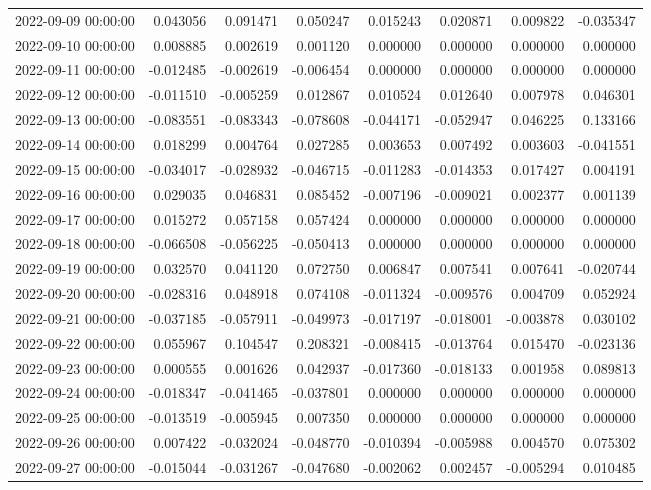 \begin{tabular}{lrrrrrrr}
2022-09-09 00:00:00 & 0.043056 & 0.091471 & 0.050247 & 0.015243 & 0.020871 & 0.009822 & -0.035347 \\
2022-09-10 00:00:00 & 0.008885 & 0.002619 & 0.001120 & 0.000000 & 0.000000 & 0.000000 & 0.000000 \\
2022-09-11 00:00:00 & -0.012485 & -0.002619 & -0.006454 & 0.000000 & 0.000000 & 0.000000 & 0.000000 \\
2022-09-12 00:00:00 & -0.011510 & -0.005259 & 0.012867 & 0.010524 & 0.012640 & 0.007978 & 0.046301 \\
2022-09-13 00:00:00 & -0.083551 & -0.083343 & -0.078608 & -0.044171 & -0.052947 & 0.046225 & 0.133166 \\
2022-09-14 00:00:00 & 0.018299 & 0.004764 & 0.027285 & 0.003653 & 0.007492 & 0.003603 & -0.041551 \\
2022-09-15 00:00:00 & -0.034017 & -0.028932 & -0.046715 & -0.011283 & -0.014353 & 0.017427 & 0.004191 \\
2022-09-16 00:00:00 & 0.029035 & 0.046831 & 0.085452 & -0.007196 & -0.009021 & 0.002377 & 0.001139 \\
2022-09-17 00:00:00 & 0.015272 & 0.057158 & 0.057424 & 0.000000 & 0.000000 & 0.000000 & 0.000000 \\
2022-09-18 00:00:00 & -0.066508 & -0.056225 & -0.050413 & 0.000000 & 0.000000 & 0.000000 & 0.000000 \\
2022-09-19 00:00:00 & 0.032570 & 0.041120 & 0.072750 & 0.006847 & 0.007541 & 0.007641 & -0.020744 \\
2022-09-20 00:00:00 & -0.028316 & 0.048918 & 0.074108 & -0.011324 & -0.009576 & 0.004709 & 0.052924 \\
2022-09-21 00:00:00 & -0.037185 & -0.057911 & -0.049973 & -0.017197 & -0.018001 & -0.003878 & 0.030102 \\
2022-09-22 00:00:00 & 0.055967 & 0.104547 & 0.208321 & -0.008415 & -0.013764 & 0.015470 & -0.023136 \\
2022-09-23 00:00:00 & 0.000555 & 0.001626 & 0.042937 & -0.017360 & -0.018133 & 0.001958 & 0.089813 \\
2022-09-24 00:00:00 & -0.018347 & -0.041465 & -0.037801 & 0.000000 & 0.000000 & 0.000000 & 0.000000 \\
2022-09-25 00:00:00 & -0.013519 & -0.005945 & 0.007350 & 0.000000 & 0.000000 & 0.000000 & 0.000000 \\
2022-09-26 00:00:00 & 0.007422 & -0.032024 & -0.048770 & -0.010394 & -0.005988 & 0.004570 & 0.075302 \\
2022-09-27 00:00:00 & -0.015044 & -0.031267 & -0.047680 & -0.002062 & 0.002457 & -0.005294 & 0.010485 \\

\end{tabular}
